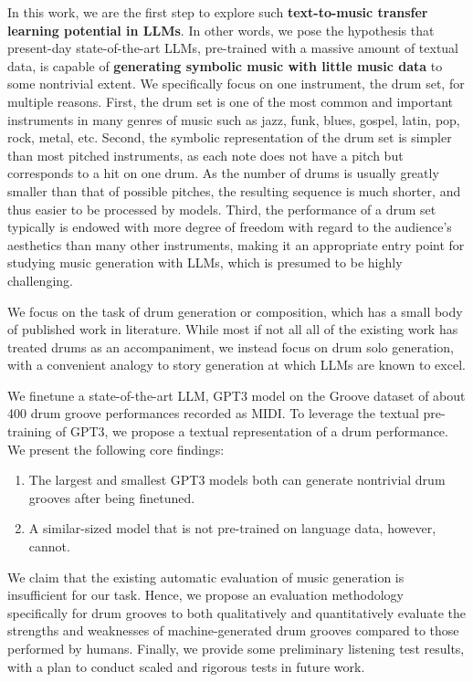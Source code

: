 \documentclass[letterpaper]{article} %
\begin{document}
In this work, we are the first step to explore such \textbf{text-to-music transfer learning potential in LLMs}. In other words, we pose the hypothesis that present-day state-of-the-art LLMs, pre-trained with a massive amount of textual data, is capable of \textbf{generating symbolic music with little music data} to some nontrivial extent. We specifically focus on one instrument, the drum set, for multiple reasons. First, the drum set is one of the most common and important instruments in many genres of music such as jazz, funk, blues, gospel, latin, pop, rock, metal, etc. Second, the symbolic representation of the drum set is simpler than most pitched instruments, as each note does not have a pitch but corresponds to a hit on one drum. As the number of drums is usually greatly smaller than that of possible pitches, the resulting sequence is much shorter, and thus easier to be processed by models. Third, the performance of a drum set typically is endowed with more degree of freedom with regard to the audience's aesthetics than many other instruments, making it an appropriate entry point for studying music generation with LLMs, which is presumed to be highly challenging. 

We focus on the task of drum generation or composition, which has a small body of published work in literature. While most if not all all of the existing work has treated drums as an accompaniment, we instead focus on drum solo generation, with a convenient analogy to story generation at which LLMs are known to excel.

We finetune a state-of-the-art LLM, GPT3 model \cite{NEURIPS2020_1457c0d6} on the Groove dataset \cite{gillick2019learning} of about 400 drum groove performances recorded as MIDI. To leverage the textual pre-training of GPT3, we propose a textual representation of a drum performance. We present the following core findings:
\begin{enumerate}
    \item The largest and smallest GPT3 models both can generate nontrivial drum grooves after being finetuned.
    \item A similar-sized model that is not pre-trained on language data, however, cannot.
\end{enumerate}
We claim that the existing automatic evaluation of music generation is insufficient for our task. Hence, we propose an evaluation methodology specifically for drum grooves to both qualitatively and quantitatively evaluate the strengths and weaknesses of machine-generated drum grooves compared to those performed by humans. Finally, we provide some preliminary listening test results, with a plan to conduct scaled and rigorous tests in future work.
\end{document}
